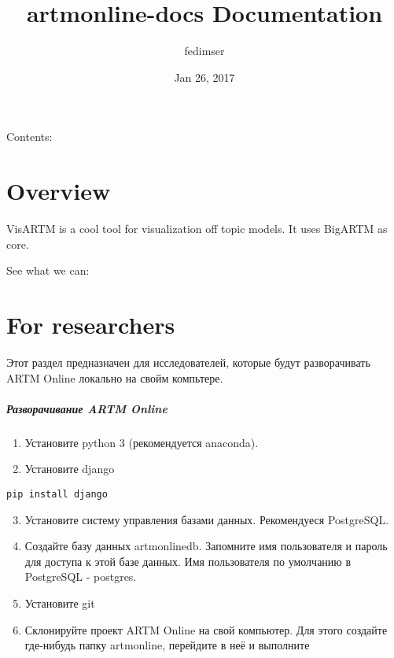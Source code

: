 \documentclass[letterpaper,10pt,english]{sphinxmanual}
\title{artmonline-docs Documentation}
\date{Jan 26, 2017}
\author{fedimser}
\begin{document}
\maketitle
\tableofcontents
{}\label{index::doc}


Contents:


\chapter{Overview}
\label{overview::doc}\label{overview:visartm-documentation}\label{overview:overview}
VisARTM is a cool tool for visualization off topic models. It uses BigARTM as core.

See what we can:


\chapter{For researchers}
\label{for_researchers::doc}\label{for_researchers:for-researchers}
Этот раздел предназначен для исследователей, которые будут разворачивать ARTM Online локально на свойм компьтере.
\paragraph{Разворачивание ARTM Online}
\begin{enumerate}
\item {} 
Установите python 3 (рекомендуется anaconda).

\item {} 
Установите django

\end{enumerate}

\begin{Verbatim}[commandchars=\\\{\}]
pip install django
\end{Verbatim}
\begin{enumerate}
\setcounter{enumi}{2}
\item {} 
Установите систему управления базами данных. Рекомендуеся PostgreSQL.

\item {} 
Создайте базу данных artmonlinedb. Запомните имя пользователя и пароль для доступа к этой базе данных. Имя пользователя по умолчанию в PostgreSQL - postgres.

\item {} 
Установите git

\item {} 
Склонируйте проект ARTM Online на свой компьютер. Для этого создайте где-нибудь папку artmonline, перейдите в неё и выполните

\end{enumerate}
\end{document}
